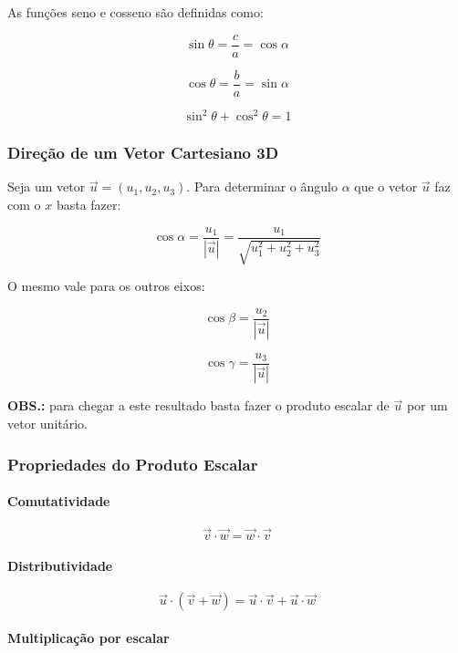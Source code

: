 As funções seno e cosseno são definidas como:

\[
\sin \theta = \frac{c}{a} = \cos \alpha
\]

\[
\cos \theta = \frac{b}{a} = \sin \alpha
\]

\[
\sin^2 \theta + \cos^2 \theta = 1
\]

\subsubsection{Direção de um Vetor Cartesiano
3D}\label{direuxe7uxe3o-de-um-vetor-cartesiano-3d}

Seja um vetor $\vec{u} = (u_1, u_2, u_3)$. Para determinar o ângulo
$\alpha$ que o vetor $\vec{u}$ faz com o $x$ basta fazer:

\[
\cos \alpha = \frac{u_1}{|\vec{u}|} = \frac{u_1}{\sqrt{u_1^2 + u_2^2 + u_3^2}}
\]

O mesmo vale para os outros eixos:

\[
\cos \beta = \frac{u_2}{|\vec{u}|}
\]

\[
\cos \gamma = \frac{u_3}{|\vec{u}|}
\]

\textbf{OBS.:} para chegar a este resultado basta fazer o produto
escalar de $\vec{u}$ por um vetor unitário.

\subsubsection{Propriedades do Produto
Escalar}\label{propriedades-do-produto-escalar}

\paragraph{Comutatividade}\label{comutatividade-1}

\[
\vec{v} \cdot \vec{w} = \vec{w} \cdot \vec{v}
\]

\paragraph{Distributividade}\label{distributividade-1}

\[
\vec{u} \cdot (\vec{v} + \vec{w}) = \vec{u} \cdot \vec{v} + \vec{u} \cdot \vec{w}
\]

\paragraph{Multiplicação por
escalar}\label{multiplicauxe7uxe3o-por-escalar}

